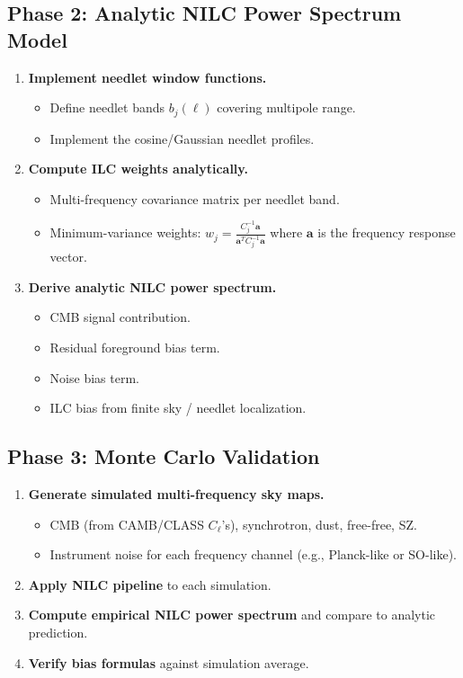 \documentclass[11pt,a4paper]{article}
\begin{document}
\subsection{Phase 2: Analytic NILC Power Spectrum Model}
\begin{enumerate}[label=\textbf{2.\arabic*}]
  \item \textbf{Implement needlet window functions.}
    \begin{itemize}
      \item Define needlet bands $b_j(\ell)$ covering multipole range.
      \item Implement the cosine/Gaussian needlet profiles.
    \end{itemize}
  \item \textbf{Compute ILC weights analytically.}
    \begin{itemize}
      \item Multi-frequency covariance matrix per needlet band.
      \item Minimum-variance weights: $w_j = \frac{C_j^{-1} \mathbf{a}}{\mathbf{a}^T C_j^{-1} \mathbf{a}}$ where $\mathbf{a}$ is the frequency response vector.
    \end{itemize}
  \item \textbf{Derive analytic NILC power spectrum.}
    \begin{itemize}
      \item CMB signal contribution.
      \item Residual foreground bias term.
      \item Noise bias term.
      \item ILC bias from finite sky / needlet localization.
    \end{itemize}
\end{enumerate}

\subsection{Phase 3: Monte Carlo Validation}
\begin{enumerate}[label=\textbf{3.\arabic*}]
  \item \textbf{Generate simulated multi-frequency sky maps.}
    \begin{itemize}
      \item CMB (from CAMB/CLASS $C_\ell$'s), synchrotron, dust, free-free, SZ.
      \item Instrument noise for each frequency channel (e.g., Planck-like or SO-like).
    \end{itemize}
  \item \textbf{Apply NILC pipeline} to each simulation.
  \item \textbf{Compute empirical NILC power spectrum} and compare to analytic prediction.
  \item \textbf{Verify bias formulas} against simulation average.
\end{enumerate}
\end{document}
